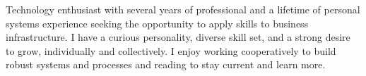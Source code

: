 
Technology enthusiast with several years of professional and a lifetime of personal systems experience seeking the opportunity to apply skills to business infrastructure. I have a curious personality, diverse skill set, and a strong desire to grow, individually and collectively. I enjoy working cooperatively to build robust systems and processes and reading to stay current and learn more.
